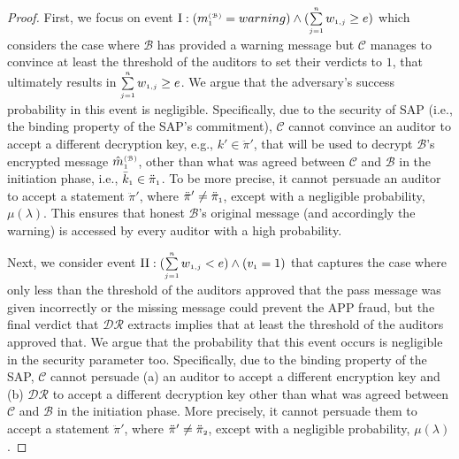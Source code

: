 \vspace{-4mm}
\begin{proof}
 First, we focus on event $\text{\MakeUppercase{\romannumeral 1}}:  (m^{\st\mathcal{(B)}}_{\st1}=warning) \wedge (\sum\limits_{\st j=1}^{\st n}w_{\st 1,j}\geq {e})$ which considers the case where $\mathcal{B}$ has provided a warning message but $\mathcal{C}$ manages to  convince at least the threshold of the auditors to set their verdicts to $1$,  that ultimately results in $\sum\limits_{\scriptscriptstyle j=1}^{\scriptscriptstyle n}w_{\scriptscriptstyle 1,j}\geq e$. We argue that the adversary's success probability in this event is negligible. Specifically, due to the security of SAP (i.e., the binding property of the SAP's commitment), $\mathcal{C}$ cannot convince an auditor to accept a different decryption key, e.g., $k'\in \ddot\pi'$, that will be used to decrypt $\mathcal{B}$'s encrypted message $\hat {m}^{\scriptscriptstyle(\mathcal {B})}_{\scriptscriptstyle 1}$, other than what was agreed between $\mathcal{C}$ and $\mathcal{B}$ in the initiation phase, i.e., $\bar k_{\scriptscriptstyle 1}\in \ddot \pi_{\scriptscriptstyle 1}$.  To be more precise, it cannot persuade an auditor to accept a statement $\ddot \pi'$, where $\ddot \pi'\neq \ddot \pi_{\scriptscriptstyle 1}$, except with a negligible probability, $\mu(\lambda)$. This ensures that  honest $\mathcal{B}$’s original message (and accordingly the warning) is accessed by every auditor with a high probability. 
 
 Next, we consider event  $\text{\MakeUppercase{\romannumeral 2}}:  (\sum\limits_{\st j=1}^{\st n}w_{\st 1,j}<{e}) \wedge ( {v}_{\st 1}=1)$ that captures the case where only less than the  threshold of the auditors approved that the pass message was given incorrectly or the missing message could  prevent the APP fraud, but the final verdict that $\mathcal{DR}$ extracts implies that at least the threshold of the auditors approved that. We argue that the probability that this event occurs is negligible in the security parameter too. Specifically, due to the binding property of the SAP,  $\mathcal{C}$ cannot persuade (a)  an auditor to accept a different encryption key and (b) $\mathcal{DR}$ to accept a different decryption key other than what was agreed between $\mathcal{C}$ and $\mathcal{B}$ in the initiation phase. More precisely, it cannot persuade them to accept a statement $\ddot \pi'$, where $\ddot \pi'\neq \ddot \pi_{\scriptscriptstyle 2}$, except with a negligible probability, $\mu(\lambda)$. %
 

\end{proof}
